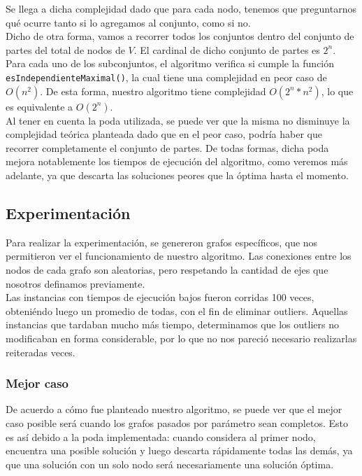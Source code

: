 Se llega a dicha complejidad dado que para cada nodo, tenemos que preguntarnos qu\'e ocurre tanto si lo agregamos al conjunto, como si no.\\

Dicho de otra forma, vamos a recorrer todos los conjuntos dentro del conjunto de partes del total de nodos de $V$. El cardinal de dicho conjunto de partes es $2^n$.\\

Para cada uno de los subconjuntos, el algoritmo verifica si cumple la funci\'on \texttt{esIndependienteMaximal()}, la cual
tiene una complejidad en peor caso de $O(n^2)$.	De esta forma, nuestro algoritmo tiene complejidad $O(2^n * n^2)$, lo que es equivalente a $O(2^n)$.\\

Al tener en cuenta la poda utilizada, se puede ver que la misma no disminuye la complejidad te\'orica planteada dado que en el peor caso, podr\'ia haber que recorrer completamente el conjunto de partes.
De todas formas, dicha poda mejora notablemente los tiempos de ejecuci\'on del algoritmo, como veremos m\'as adelante, ya que descarta las soluciones peores que la \'optima hasta el momento.\\

\newpage
\subsection{Experimentaci\'on}
Para realizar la experimentaci\'on, se genereron grafos espec\'ificos, que nos permitieron ver el funcionamiento de nuestro algoritmo.
Las conexiones entre los nodos de cada grafo son aleatorias, pero respetando la cantidad de ejes que nosotros definamos previamente.\\

Las instancias con tiempos de ejecuci\'on bajos fueron corridas 100 veces, obteni\'endo luego un promedio de todas, con el fin de eliminar outliers.
Aquellas instancias que tardaban mucho m\'as tiempo, determinamos que los outliers no modificaban en forma considerable, por lo que no nos pareci\'o necesario realizarlas reiteradas veces.

\subsubsection{Mejor caso}
De acuerdo a c\'omo fue planteado nuestro algoritmo, se puede ver que el mejor caso posible ser\'a cuando los grafos pasados por par\'ametro sean completos.
Esto es as\'i debido a la poda implementada: cuando considera al primer nodo, encuentra una posible soluci\'on y luego descarta r\'apidamente todas las dem\'as, ya que una soluci\'on con un solo nodo 
ser\'a necesariamente una soluci\'on \'optima.\\

